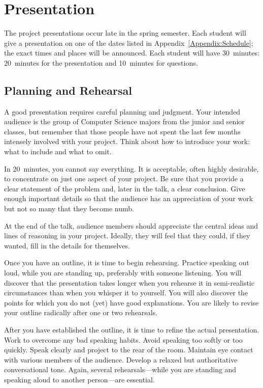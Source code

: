 \documentclass[finalcopy]{srpaper}
\def\hyperref[#1]{}
\let\plainref\ref
\newcommand{\plainref}{\ref*}
\newcommand{\namedref}[2]{\hyperref[#2]{#1~\plainref{#2}}}
\begin{document}
%
%
\chapter{Presentation}
\label{Chapter:Presentation}
The project presentations occur late in the spring
semester. Each student will give a presentation on one of 
the dates listed in
\namedref{Appendix}{Appendix:Schedule}; the exact times
and places will be announced. Each student will have
30~minutes: 20~minutes for the presentation and 
10~minutes for questions.


\section{Planning and Rehearsal}
A good presentation requires careful planning and
judgment. Your intended audience is the group of Computer
Science majors from the junior and senior classes, but
remember that those people have not spent the last few
months intensely involved with your project. Think about how
to introduce your work: what to include and what to omit.

In 20~minutes, you cannot say everything. It is acceptable,
often highly desirable, to concentrate on just one aspect of
your project. Be sure that you provide a clear statement of
the problem and, later in the talk, a clear conclusion. Give
enough important details so that the audience has an
appreciation of your work but not so many that they become
numb.

At the end of the talk, audience members should appreciate
the central ideas and lines of reasoning in your
project. Ideally, they will feel that they could, if they
wanted, fill in the details for themselves.

Once you have an outline, it is time to begin
rehearsing. Practice speaking out loud, while you are
standing up, preferably with someone listening. You will
discover that the presentation takes longer when you
rehearse it in semi-realistic circumstances than when you
whisper it to yourself. You will also discover the points
for which you do not (yet) have good explanations. You are
likely to revise your outline radically after one or two
rehearsals.

After you have established the outline, it is time to refine
the actual presentation. Work to overcome any bad speaking
habits. Avoid speaking too softly or too quickly. Speak
clearly and project to the rear of the room. Maintain eye
contact with various members of the audience. Develop a
relaxed but authoritative conversational tone. Again,
several rehearsals---while you are standing and speaking
aloud to another person---are essential.
\end{document}
